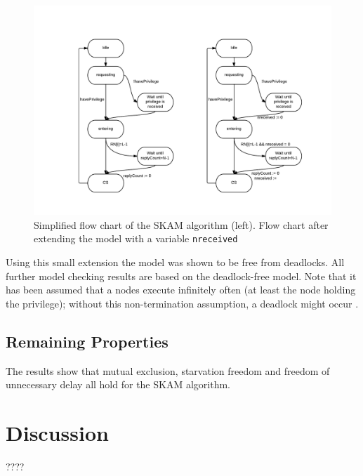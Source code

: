 \documentclass[a4paper,12pt]{llncs}
\begin{document}
\begin{figure}[!ht]
\begin{center}
\includegraphics[width=\textwidth]{diagramboth.pdf}
 \caption[Close up of \textit{Hemidactylus} sp.]
   {Simplified flow chart of the SKAM algorithm (left). Flow chart after extending the model with a variable \texttt{nreceived}}
\end{center}
\end{figure}

Using this small extension the model was shown to be free from deadlocks. All further model checking results are based on the deadlock-free model. Note that it has been assumed that a nodes execute infinitely often (at least the node holding the privilege); without this non-termination assumption, a deadlock might occur  \cite{OgataSAL}\cite{OgataMaude}.

\subsection{Remaining Properties}
The results show that mutual exclusion, starvation freedom and freedom of unnecessary delay all hold for the SKAM algorithm. 


\section{Discussion}
????
\end{document}
